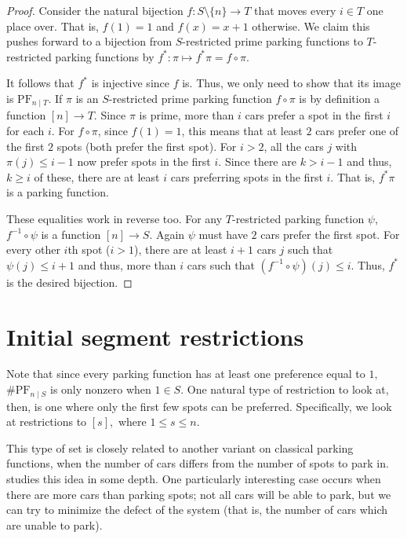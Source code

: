 \documentclass[12 pt]{amsart}
\theoremstyle{definition} %
\theoremstyle{remark} %
\begin{document}
\begin{proof}
	Consider the natural bijection $f : S \setminus \{ n \} \to T$ that moves every $i \in T$ one place over. That is, $f(1) = 1$ and $f(x) = x + 1$ otherwise. We claim this pushes forward to a bijection from $S$-restricted prime parking functions to $T$-restricted parking functions by $f^{*} : \pi \mapsto f^{*} \pi = f \circ \pi$.

	It follows that $f^{*}$ is injective since $f$ is. Thus, we only need to show that its image is $\mathrm{PF}_{n \mid T}$. If $\pi$ is an $S$-restricted prime parking function $f \circ \pi$ is by definition a function $[n] \to T$. Since $\pi$ is prime, more than $i$ cars prefer a spot in the first $i$ for each $i$. For $f \circ \pi$, since $f(1) = 1$, this means that at least $2$ cars prefer one of the first $2$ spots (both prefer the first spot). For $i > 2$, all the cars $j$ with $\pi(j) \le i - 1$ now prefer spots in the first $i$. Since there are $k > i - 1$ and thus, $k \ge i$ of these, there are at least $i$ cars preferring spots in the first $i$. That is, $f^{*} \pi$ is a parking function.

	These equalities work in reverse too. For any $T$-restricted parking function $\psi$, $f^{-1} \circ \psi$ is a function $[n] \to S$. Again $\psi$ must have $2$ cars prefer the first spot. For every other $i$th spot ($i > 1$), there are at least $i + 1$ cars $j$ such that $\psi(j) \le i + 1$ and thus, more than $i$ cars such that $(f^{-1} \circ \psi)(j) \le i$. Thus, $f^{*}$ is the desired bijection.
\end{proof}

\section{Initial segment restrictions} 

Note that since every parking function has at least one preference equal to $1,$ $\# \mathrm{PF}_{n\mid S}$ is only nonzero when $1\in S.$ One natural type of restriction to look at, then, is one where only the first few spots can be preferred. Specifically, we look at restrictions to $[s],$ where $1\le s\le n.$

This type of set is closely related to another variant on classical parking functions, when the number of cars differs from the number of spots to park in. \cite{cameron-johannsen-prellberg-schweitzer-2008} studies this idea in some depth. One particularly interesting case occurs when there are more cars than parking spots; not all cars will be able to park, but we can try to minimize the defect of the system (that is, the number of cars which are unable to park).
\end{document}
